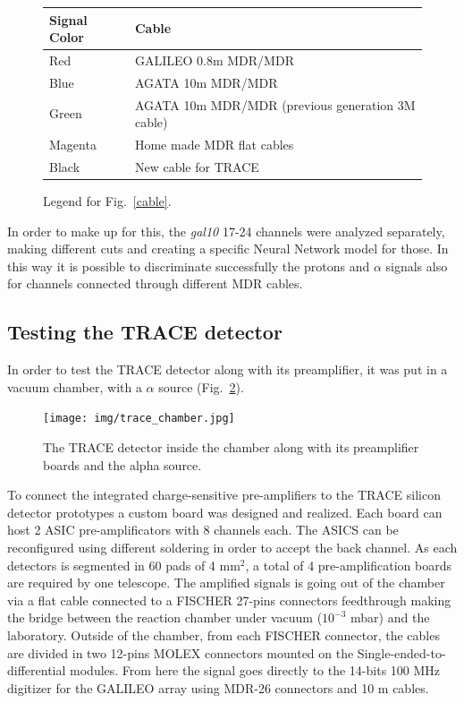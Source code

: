 \begin{figure}
  \begin{tabular}{ll}
    Signal Color & Cable \\
    \midrule
    Red & GALILEO 0.8m MDR/MDR \\
    Blue & AGATA 10m MDR/MDR \\
    Green & AGATA 10m MDR/MDR (previous generation 3M cable) \\
    Magenta & Home made MDR flat cables \\
    Black & New cable for TRACE \\
    \bottomrule
  \end{tabular}
  \caption{Legend for Fig.~\ref{cable}.}
  \label{cables}
\end{figure}

\bigbreak

In order to make up for this, the \textit{gal10} 17-24 channels were analyzed
separately, making different cuts and creating a specific Neural Network model
for those. In this way it is possible to discriminate successfully the
protons and $\alpha$ signals also for channels connected through different MDR
cables.

\subsection{Testing the TRACE detector}

In order to test the TRACE detector along with its preamplifier, it was put in a vacuum chamber, with a $\alpha$ source (Fig.~\ref{trace_chamber}).

\begin{figure}[h]
  \centering
  \texttt{[image: img/trace\_chamber.jpg]}
  \caption{The TRACE detector inside the chamber along with its preamplifier boards and the alpha source.}
  \label{trace_chamber}
\end{figure}

\bigbreak

To connect the integrated charge-sensitive pre-amplifiers to the TRACE silicon detector prototypes a custom board was designed and realized. Each board can host 2 ASIC pre-amplificators with 8 channels each. The ASICS can be reconfigured using different soldering in order to accept the back channel. As each detectors is segmented in 60 pads of 4 mm$^2$, a total of 4 pre-amplification boards are required by one telescope.
The amplified signals is going out of the chamber via a flat cable connected to a FISCHER 27-pins connectors feedthrough making the bridge between the reaction chamber under vacuum ($10^{-3}$ mbar) and the laboratory. Outside of the chamber, from each FISCHER connector, the cables are divided in two 12-pins MOLEX connectors mounted on the Single-ended-to-differential modules. From here the signal goes directly to the 14-bits 100 MHz digitizer for the GALILEO array using MDR-26 connectors and 10 m cables.

